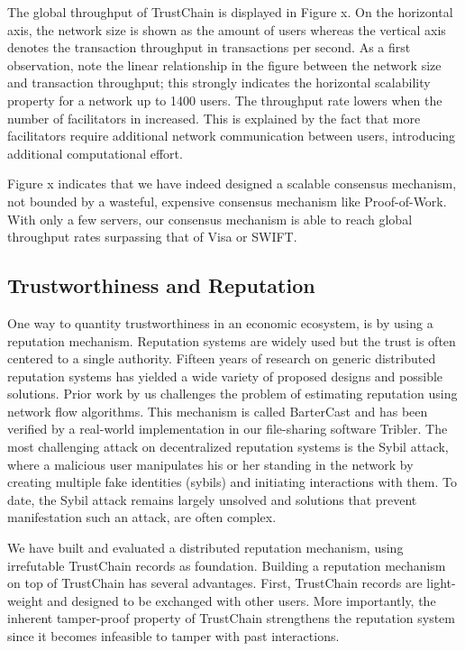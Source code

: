 \documentclass[USenglish]{article}
\begin{document}
The global throughput of TrustChain is displayed in Figure x.
On the horizontal axis, the network size is shown as the amount of users whereas the vertical axis denotes the transaction throughput in transactions per second.
As a first observation, note the linear relationship in the figure between the network size and transaction throughput; this strongly indicates the horizontal scalability property for a network up to 1400 users.
The throughput rate lowers when the number of facilitators in increased. This is explained by the fact that more facilitators require additional network communication between users, introducing additional computational effort.

Figure x indicates that we have indeed designed a scalable consensus mechanism, not bounded by a wasteful, expensive consensus mechanism like Proof-of-Work.
With only a few servers, our consensus mechanism is able to reach global throughput rates surpassing that of Visa or SWIFT.

\subsection{Trustworthiness and Reputation}

One way to quantity trustworthiness in an economic ecosystem, is by using a reputation mechanism.
Reputation systems are widely used but the trust is often centered to a single authority.
Fifteen years of research on generic distributed reputation systems has yielded a wide variety of proposed designs and possible solutions.
Prior work by us challenges the problem of estimating reputation using network flow algorithms.
This mechanism is called BarterCast and has been verified by a real-world implementation in our file-sharing software Tribler.
The most challenging attack on decentralized reputation systems is the Sybil attack, where a malicious user manipulates his or her standing in the network by creating multiple fake identities (sybils) and initiating interactions with them.
To date, the Sybil attack remains largely unsolved and solutions that prevent manifestation such an attack, are often complex.

We have built and evaluated a distributed reputation mechanism, using irrefutable TrustChain records as foundation.
Building a reputation mechanism on top of TrustChain has several advantages.
First, TrustChain records are light-weight and designed to be exchanged with other users.
More importantly, the inherent tamper-proof property of TrustChain strengthens the reputation system since it becomes infeasible to tamper with past interactions.
\end{document}
